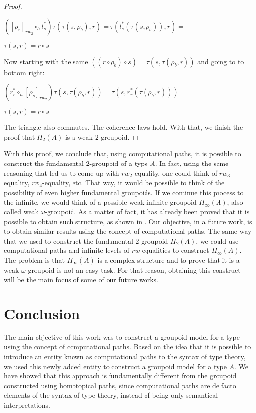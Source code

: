 \documentclass[12pt, a4paper,  oneside, headinclude,footinclude, BCOR5mm]{scrartcl}
\begin{document}
\begin{proof}
\begin{center}
$([\rho_{r}]_{rw_{2}} \circ_{h} l^{*}_{s})\tau(\tau(s,\rho_{b}),r) = \tau(l^{*}_{s}(\tau(s,\rho_{b})),r) = $

$\tau(s,r) = r \circ s$
\end{center}

Now starting with the same $((r \circ \rho_{b}) \circ s) = \tau(s,\tau(\rho_{b},r))$ and going to to bottom right:

\begin{center}
$(r^{*}_{r} \circ_{h} [\rho_{s}]_{rw_{2}})\tau(s,\tau(\rho_{b},r)) = \tau(s,r^{*}_{r}(\tau(\rho_{b},r))) =$

$\tau(s,r) = r \circ s$
\end{center}

The triangle also commutes. The coherence laws hold. With that, we finish the proof that $\Pi_{2}(A)$ is a weak $2$-groupoid.

\end{proof}

With this proof, we conclude that, using computational paths, it is possible to construct the fundamental $2$-groupoid of a type $A$. In fact, using the same reasoning that led us to come up with $rw_{2}$-equality, one could think of $rw_{3}$-equality, $rw_{4}$-equality, etc. That way, it would be possible to think of the possibility of even higher fundamental groupoids. If we continue this process to the infinite, we would think of a possible weak infinite groupoid $\Pi_{\infty}(A)$, also called weak $\omega$-groupoid. As a matter of fact, it has already been proved that it is possible to obtain such structure, as shown in \cite{lumsdaine1, Benno}. Our objective, in a future work, is to obtain similar results using the concept of computational paths. The same way that we used to construct the fundamental $2$-groupoid $\Pi_{2}(A)$, we could use computational paths and infinite levels of $rw$-equalities to construct $\Pi_{\infty}(A)$. The problem is that $\Pi_{\infty}(A)$ is a complex structure and to prove that it is a weak $\omega$-groupoid is not an easy task. For that reason, obtaining this construct will be the main focus of some of our future works.

\section{Conclusion}

The main objective of this work was to construct a groupoid model for a type using the concept of computational paths. Based on the idea that it is possible to introduce an entity known as computational paths to the syntax of type theory, we used this newly added entity to construct a groupoid model for a type $A$. We have showed that this approach is fundamentally different from the groupoid constructed using homotopical paths, since computational paths are de facto elements of the syntax of type theory, instead of being only semantical interpretations.
\end{document}
